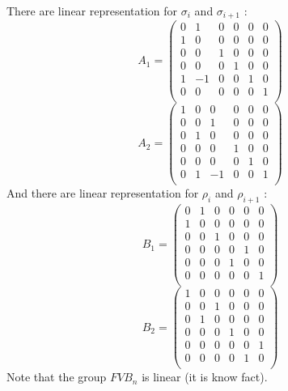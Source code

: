 \documentclass{article}
\begin{document}
There are linear representation for $\sigma_i$ and $\sigma_{i+1}$ :
\begin{equation*}
A_1 = 
\begin{pmatrix}
  0& 1& 0& 0& 0& 0\\
  1& 0& 0& 0& 0& 0\\
  0& 0& 1& 0& 0& 0\\
  0& 0& 0& 1& 0& 0\\
  1& -1& 0& 0& 1& 0\\
  0& 0& 0& 0& 0& 1\\
\end{pmatrix}
\end{equation*}
\begin{equation*}
A_2 = 
\begin{pmatrix}
 1& 0& 0& 0& 0& 0\\
  0& 0& 1& 0& 0& 0\\
  0& 1& 0& 0& 0& 0\\
  0& 0& 0& 1& 0& 0\\
  0& 0& 0& 0& 1& 0\\
  0& 1& -1& 0& 0& 1\\
\end{pmatrix}
\end{equation*}
And there are linear representation for $\rho_i$ and $\rho_{i+1}$ :
\begin{equation*}
B_1 = 
\begin{pmatrix}
0& 1& 0& 0& 0& 0\\
  1& 0& 0& 0& 0& 0\\
  0& 0& 1& 0& 0& 0\\
  0& 0& 0& 0& 1& 0\\
  0& 0& 0& 1& 0& 0\\
  0& 0& 0& 0& 0& 1\\
\end{pmatrix}
\end{equation*}
\begin{equation*}
B_2 = 
\begin{pmatrix}
  1& 0& 0& 0& 0& 0\\
  0& 0& 1& 0& 0& 0\\
  0& 1& 0& 0& 0& 0\\
  0& 0& 0& 1& 0& 0\\
  0& 0& 0& 0& 0& 1\\
  0& 0& 0& 0& 1& 0\\
\end{pmatrix}
\end{equation*}
Note that the group $FVB_n$ is linear (it is know fact).
\end{document}

